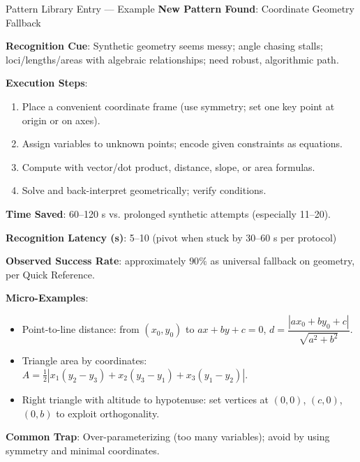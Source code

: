 \documentclass{article}
\begin{document}
\begin{analysisbox}{Pattern Library Entry — Example}
\textbf{New Pattern Found}: Coordinate Geometry Fallback

\textbf{Recognition Cue}: Synthetic geometry seems messy; angle chasing stalls; loci/lengths/areas with algebraic relationships; need robust, algorithmic path.

\textbf{Execution Steps}:
\begin{enumerate}[nosep]
\item Place a convenient coordinate frame (use symmetry; set one key point at origin or on axes).
\item Assign variables to unknown points; encode given constraints as equations.
\item Compute with vector/dot product, distance, slope, or area formulas.
\item Solve and back-interpret geometrically; verify conditions.
\end{enumerate}

\textbf{Time Saved}: 60--120 s vs. prolonged synthetic attempts (especially 11--20).

\textbf{Recognition Latency (s)}: 5--10 (pivot when stuck by 30--60 s per protocol)

\textbf{Observed Success Rate}: approximately $90\%$ as universal fallback on geometry, per Quick Reference.

\textbf{Micro-Examples}:
\begin{itemize}[nosep]
\item Point-to-line distance: from $(x_0,y_0)$ to $ax+by+c=0$, $d=\dfrac{|ax_0+by_0+c|}{\sqrt{a^2+b^2}}$.
\item Triangle area by coordinates: $A=\tfrac{1}{2}|x_1(y_2-y_3)+x_2(y_3-y_1)+x_3(y_1-y_2)|$.
\item Right triangle with altitude to hypotenuse: set vertices at $(0,0)$, $(c,0)$, $(0,b)$ to exploit orthogonality.
\end{itemize}

\textbf{Common Trap}: Over-parameterizing (too many variables); avoid by using symmetry and minimal coordinates.
\end{analysisbox}
\end{document}
